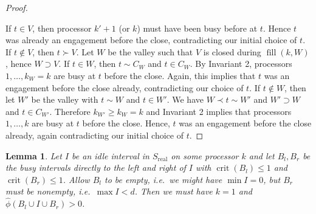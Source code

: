 \documentclass[a4paper]{article}
\DeclareMathOperator{\real}{real}
\DeclareMathOperator{\crit}{crit}
\DeclareMathOperator{\fillop}{fill}
\newtheorem{lemma}[theorem]{Lemma}
\begin{document}
\begin{proof}




  \begin{figure}[H]
    \centering
    
  \end{figure}
  If $t \in V$, then processor $k' + 1$ (or $k$) must have been busy before at $t$.
  Hence $t$ was already an engagement before the close, contradicting our initial choice of $t$.
  If $t \notin V$, then $t \succ V$.
  Let $W$ be the valley such that $V$ is closed during $\fillop(k, W)$, hence $W \supset V$.
  If $t \in W$, then $t \sim C_W$ and $t \in C_W$.
  By Invariant 2, processors $1, \ldots, k_W = k$ are busy at $t$ before the close.
  Again, this implies that $t$ was an engagement before the close already, contradicting our choice of $t$.
  If $t \notin W$, then let $W'$ be the valley with $t \sim W$ and $t \in W'$.
  We have $W \prec t \sim W'$ and $W' \supset W$ and $t \in C_{W'}$.
  Therefore $k_{W'} \geq k_W = k$ and Invariant 2 implies that processors $1, \ldots, k$ are busy at $t$ before the close.
  Hence, $t$ was an engagement before the close already, again contradicting our initial choice of $t$.
\end{proof}
\begin{lemma}\label{lemma:constellation}
  Let $I$ be an idle interval in $S_{\real}$ on some processor $k$ and let $B_l, B_r$ be the busy intervals directly to the left and right of $I$ with $\crit(B_l) \leq 1$ and $\crit(B_r) \leq 1$.
  Allow $B_l$ to be empty, i.e.\ we might have $\min I = 0$, but $B_r$ must be nonempty, i.e.\ $\max I < d$.
  Then we must have $k = 1$ and $\hat \phi(B_l \cup I \cup B_r) > 0$.
\end{lemma}
\end{document}
